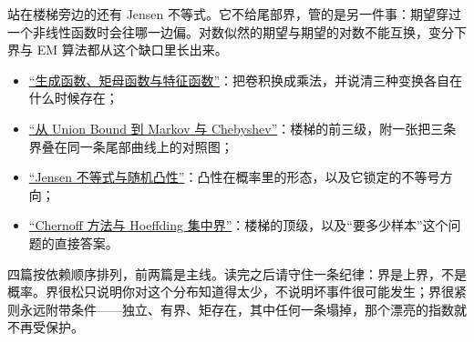 站在楼梯旁边的还有 Jensen 不等式。它不给尾部界，管的是另一件事：期望穿过一个非线性函数时会往哪一边偏。对数似然的期望与期望的对数不能互换，变分下界与 EM 算法都从这个缺口里长出来。

\begin{itemize}
\tightlist
\item \hyperref[sec:05-Probability/07-Transforms-and-Bounds/01]{``生成函数、矩母函数与特征函数''}：把卷积换成乘法，并说清三种变换各自在什么时候存在；
\item \hyperref[sec:05-Probability/07-Transforms-and-Bounds/02]{``从 Union Bound 到 Markov 与 Chebyshev''}：楼梯的前三级，附一张把三条界叠在同一条尾部曲线上的对照图；
\item \hyperref[sec:05-Probability/07-Transforms-and-Bounds/03]{``Jensen 不等式与随机凸性''}：凸性在概率里的形态，以及它锁定的不等号方向；
\item \hyperref[sec:05-Probability/07-Transforms-and-Bounds/04]{``Chernoff 方法与 Hoeffding 集中界''}：楼梯的顶级，以及``要多少样本''这个问题的直接答案。
\end{itemize}

四篇按依赖顺序排列，前两篇是主线。读完之后请守住一条纪律：界是上界，不是概率。界很松只说明你对这个分布知道得太少，不说明坏事件很可能发生；界很紧则永远附带条件——独立、有界、矩存在，其中任何一条塌掉，那个漂亮的指数就不再受保护。
